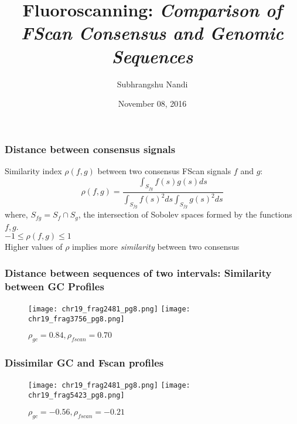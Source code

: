 \documentclass[10pt,dvipsnames,table]{beamer}
\title[Fluoroscanning]{Fluoroscanning: {\emph{Comparison of FScan Consensus and Genomic Sequences}}}
\author{Subhrangshu Nandi}
\date{November 08, 2016}
\begin{document}
\setlength{\baselineskip}{16truept}
\frame{\maketitle}

\begin{frame}
\frametitle{Distance between consensus signals}
Similarity index $\rho(f, g)$ between two consensus FScan signals $f$ and $g$:
\[ \rho(f, g) = \frac{\int _{S_{fg}}f(s)g(s) ds}{\int _{S_{fg}}f(s)^2 ds \int _{S_{fg}}g(s)^2 ds} \]
where, $S_{fg} = S_f \cap S_g$, the intersection of Sobolev spaces formed by the functions $f, g$.\\
$-1 \leq \rho(f, g) \leq 1$ \\
Higher values of $\rho$ implies more {\emph{similarity}} between two consensus

\end{frame}

\begin{frame}
\frametitle{Distance between sequences of two intervals: Similarity between GC Profiles}
\begin{figure}
\centering
\texttt{[image: chr19\_frag2481\_pg8.png]}
\texttt{[image: chr19\_frag3756\_pg8.png]}
\caption{$\rho_{gc} = 0.84, \rho_{fscan} = 0.70$}
\end{figure}

\end{frame}

\begin{frame}
\frametitle{Dissimilar GC and Fscan profiles}
\begin{figure}
\centering
\texttt{[image: chr19\_frag2481\_pg8.png]}
\texttt{[image: chr19\_frag5423\_pg8.png]}
\caption{$\rho_{gc} = -0.56, \rho_{fscan} = -0.21$}
\end{figure}

\end{frame}
\end{document}
